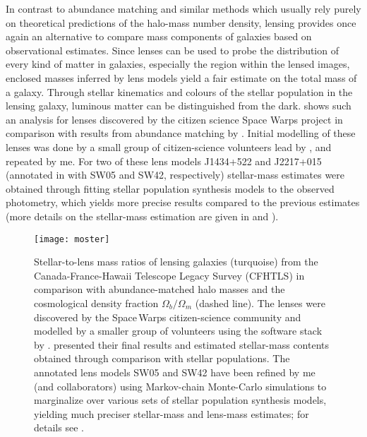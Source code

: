 In contrast to abundance matching and similar methods which usually rely purely
on theoretical predictions of the halo-mass number density, lensing provides
once again an alternative to compare mass components of galaxies based on
observational estimates.  Since lenses can be used to probe the distribution of
every kind of matter in galaxies, especially the region within the lensed
images, enclosed masses inferred by lens models yield a fair estimate on the
total mass of a galaxy. Through stellar kinematics and colours of the stellar
population in the lensing galaxy, luminous matter can be distinguished from the
dark.   shows such an analysis for lenses discovered by the
citizen science Space Warps project in comparison with results from abundance
matching by .  Initial modelling of these lenses was done
by a small group of citizen-science volunteers lead by , and
repeated by me.  For two of these lens models J1434+522 and J2217+015 (annotated
in  with SW05 and SW42, respectively) stellar-mass estimates were
obtained through fitting stellar population synthesis models to the observed
photometry, which yields more precise results compared to the previous estimates
(more details on the stellar-mass estimation are given in  and
).

\begin{figure}[h]%
    \centering%
    \texttt{[image: moster]}%
    \caption[Stellar-to-lens mass ratios of lensing galaxies]{Stellar-to-lens
        mass ratios of lensing galaxies (turquoise) from the
        Canada-France-Hawaii Telescope Legacy Survey (CFHTLS) in comparison with
        abundance-matched halo masses \cite[blue line; cf. Moster et
        al.][]{Moster12} and the cosmological density fraction
        $\Omega_{b}/\Omega_{m}$ (dashed line).  The lenses were discovered by
        the Space\,Warps citizen-science community and modelled by a smaller
        group of volunteers using the  software stack by
        .   presented their final results and
        estimated stellar-mass contents obtained through comparison with stellar
        populations.  The annotated lens models SW05 and SW42 have been refined
        by me (and collaborators) using Markov-chain Monte-Carlo simulations to
        marginalize over various sets of stellar population synthesis models,
        yielding much preciser stellar-mass and lens-mass estimates; for details
        see .  }%
\end{figure}%